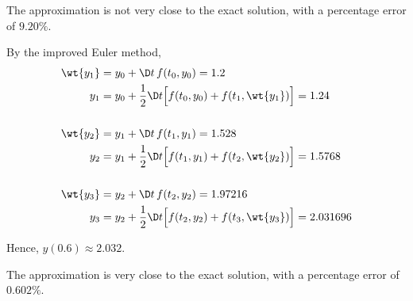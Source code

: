\begin{solution}
\begin{ppart}
        The approximation is not very close to the exact solution, with a percentage error of $9.20\%$.
    \end{ppart}
    \begin{ppart}
        By the improved Euler method, 
        \begin{align*}
            \wt{y_1} &= y_0 + \D t \, f(t_0, y_0) = 1.2\\
            y_1 &= y_0 + \frac12 \D t \Big[f(t_0, y_0) + f(t_1, \wt{y_1})\Big] = 1.24\\\\
            \wt{y_2} &= y_1 + \D t \, f(t_1, y_1) = 1.528\\
            y_2 &= y_1 + \frac12 \D t \Big[f(t_1, y_1) + f(t_2, \wt{y_2})\Big] = 1.5768\\\\
            \wt{y_3} &= y_2 + \D t \, f(t_2, y_2) = 1.97216\\
            y_3 &= y_2 + \frac12 \D t \Big[f(t_2, y_2) + f(t_3, \wt{y_3})\Big] = 2.031696
        \end{align*}

        Hence, $y(0.6) \approx 2.032$.

        The approximation is very close to the exact solution, with a percentage error of $0.602\%$.
    \end{ppart}
\end{solution}

